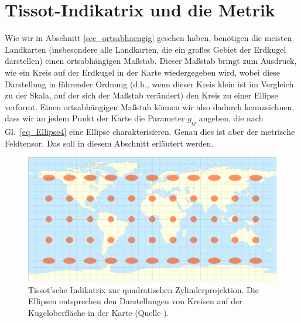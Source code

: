 \section{Tissot-Indikatrix und die Metrik} 
\label{sec_Tissot}

Wie wir in Abschnitt \ref{sec_ortsabhaengig} gesehen haben, ben\"otigen die meisten
Landkarten (insbesondere alle Landkarten, die ein gro\ss es Gebiet der Erdkugel darstellen)
einen ortsabh\"angigen Ma\ss stab. Dieser Ma\ss stab bringt zum Ausdruck, wie
ein Kreis auf der Erdkugel in der Karte wiedergegeben wird, wobei diese Darstellung
in f\"uhrender Ordnung (d.h., wenn dieser Kreis klein ist im Vergleich zu der Skala, auf
der sich der Ma\ss stab ver\"andert) den Kreis zu einer Ellipse verformt. Einen ortsabh\"angigen   
Ma\ss stab k\"onnen wir also dadurch kennzeichnen, dass wir an jedem Punkt der Karte die
Parameter $g_{ij}$ angeben, die nach Gl.\ \ref{eq_Ellipse4} eine Ellipse charakterisieren. Genau
dies ist aber der metrische Feldtensor. Das soll in diesem Abschnitt erl\"autert werden. 

\begin{figure}[htb]
\includegraphics[scale=0.17]{./Bilder/Tissot_rectangle.png}
\caption{\label{fig_Tissot1}%
Tissot'sche Indikatrix zur quadratischen Zylinderprojektion. Die Ellipsen entsprechen den
Darstellungen von Kreisen auf der Kugeloberfl\"ache in der Karte (Quelle \cite{WikiTissot}).}
\end{figure}


